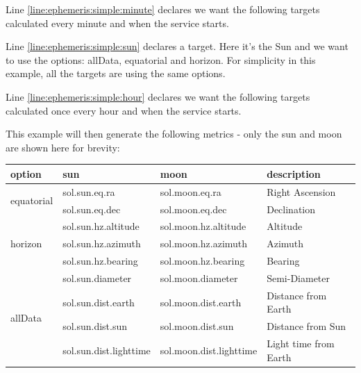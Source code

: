 Line \ref{line:ephemeris:simple:minute} declares we want the following targets calculated every minute and
when the service starts.

Line \ref{line:ephemeris:simple:sun} declares a target. Here it's the Sun and we want to use the options:
allData, equatorial and horizon.
For simplicity in this example, all the targets are using the same options.

Line \ref{line:ephemeris:simple:hour} declares we want the following targets calculated once every hour and
when the service starts.

This example will then generate the following metrics - only the sun and moon are shown here for brevity:

\begin{table}[ht]
    \begin{tabular}{l|l|l|l}
        \hline
        \textbf{option} & \textbf{sun} & \textbf{moon} & \textbf{description} \\
        \hline
        \multirow{2}{*}{equatorial} & sol.sun.eq.ra & sol.moon.eq.ra & Right Ascension \\
            & sol.sun.eq.dec & sol.moon.eq.dec & Declination \\
        \hline
        \multirow{3}{*}{horizon} & sol.sun.hz.altitude & sol.moon.hz.altitude & Altitude \\
            & sol.sun.hz.azimuth & sol.moon.hz.azimuth & Azimuth \\
            & sol.sun.hz.bearing & sol.moon.hz.bearing & Bearing \\
            \hline
        \multirow{4}{*}{allData} & sol.sun.diameter & sol.moon.diameter & Semi-Diameter \\
            & sol.sun.dist.earth & sol.moon.dist.earth & Distance from Earth \\
            & sol.sun.dist.sun & sol.moon.dist.sun & Distance from Sun \\
            & sol.sun.dist.lighttime & sol.moon.dist.lighttime & Light time from Earth \\
            \hline
    \end{tabular}
\end{table}
